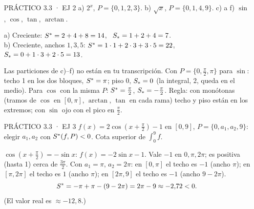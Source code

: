 \begin{enunciado}{PRÁCTICO 3.3 · EJ 2}
a) $2^x$, $P=\{0,1,2,3\}$. b) $\sqrt x$, $P=\{0,1,4,9\}$. c) a f) $\sin$, $\cos$, $\tan$, $\arctan$.
\end{enunciado}
a) Creciente: $S^{*}=2+4+8=14$, \ $S_{*}=1+2+4=7$.\\
b) Creciente, anchos $1,3,5$: $S^{*}=1\cdot1+2\cdot3+3\cdot5=22$, \ $S_{*}=0+1\cdot3+2\cdot5=13$.
\begin{falta}
Las particiones de c)–f) no están en tu transcripción. Con $P=\{0,\frac\pi2,\pi\}$ para $\sin$: techo 1 en los dos bloques, $S^{*}=\pi$; piso 0, $S_{*}=0$ (la integral, 2, queda en el medio). Para $\cos$ con la misma $P$: $S^{*}=\frac\pi2$, $S_{*}=-\frac\pi2$. Regla: con monótonas (tramos de $\cos$ en $[0,\pi]$, $\arctan$, $\tan$ en cada rama) techo y piso están en los extremos; con $\sin$ ojo con el pico en $\frac\pi2$.
\end{falta}

\begin{enunciado}{PRÁCTICO 3.3 · EJ 3}
$f(x)=2\cos(x+\frac\pi2)-1$ en $[0,9]$, $P=\{0,a_1,a_2,9\}$: elegir $a_1,a_2$ con $S^{*}(f,P)<0$. Cota superior de $\int_0^9f$.
\end{enunciado}
$\cos(x+\frac\pi2)=-\sin x$: $f(x)=-2\sin x-1$. Vale $-1$ en $0,\pi,2\pi$; es positiva (hasta 1) cerca de $\frac{3\pi}2$.
Con $a_1=\pi$, $a_2=2\pi$: en $[0,\pi]$ el techo es $-1$ (ancho $\pi$); en $[\pi,2\pi]$ el techo es $1$ (ancho $\pi$); en $[2\pi,9]$ el techo es $-1$ (ancho $9-2\pi$).
\[S^{*}=-\pi+\pi-(9-2\pi)=2\pi-9\approx-2{,}72<0.\]
(El valor real es $\approx-12{,}8$.)

